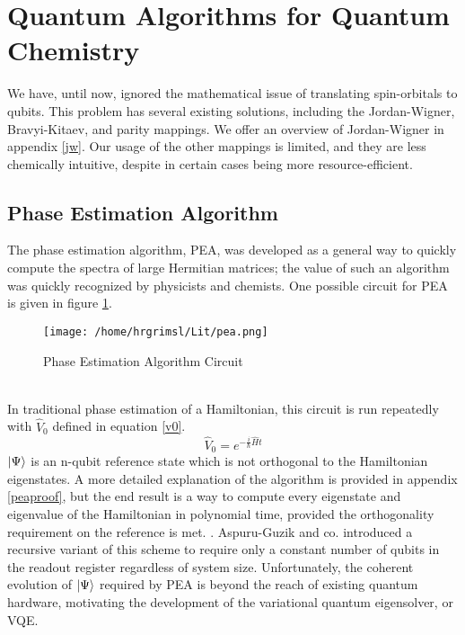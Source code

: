 \documentclass{article}
\begin{document}
\section{Quantum Algorithms for Quantum Chemistry}
\begin{paragraph}{}
We have, until now, ignored the mathematical issue of translating spin-orbitals to qubits.  This problem has several existing solutions, including the Jordan-Wigner, Bravyi-Kitaev, and parity mappings.  We offer an overview of Jordan-Wigner in appendix \ref{jw}.  Our usage of the other mappings is limited, and they are less chemically intuitive, despite in certain cases being more resource-efficient.
\end{paragraph}
\subsection{Phase Estimation Algorithm}
\begin{paragraph}{}
The phase estimation algorithm, PEA, was developed as a general way to quickly compute the spectra of large Hermitian matrices; the value of such an algorithm was quickly recognized by physicists and chemists. \cite{lloyd, alan} One possible circuit for PEA is given in figure \ref{pea}. \cite{alan, lloyd}
\begin{figure}[h!]\caption{Phase Estimation Algorithm Circuit}\label{pea}
\begin{center}
\texttt{[image: /home/hrgrimsl/Lit/pea.png]}
\end{center}
\end{figure}\\
In traditional phase estimation of a Hamiltonian, this circuit is run repeatedly with $\hat{V}_0$ defined in equation \ref{v0}. \cite{lloyd}
\begin{equation}\label{v0}
\hat{V}_0 = e^{-\frac{i}{\hbar}\hat{H}t}
\end{equation}
$\ket{\Psi}$ is an n-qubit reference state which is not orthogonal to the Hamiltonian eigenstates. \cite{lloyd}  A more detailed explanation of the algorithm is provided in appendix \ref{peaproof}, but the end result is a way to compute every eigenstate and eigenvalue of the Hamiltonian in polynomial time, provided the orthogonality requirement on the reference is met. \cite{lloyd}. Aspuru-Guzik and co. introduced a recursive variant of this scheme to require only a constant number of qubits in the readout register regardless of system size. \cite{alan} Unfortunately, the coherent evolution of $\ket{\Psi}$ required by PEA is beyond the reach of existing quantum hardware, motivating the development of the variational quantum eigensolver, or VQE. \cite{peruzzo} 
\end{paragraph}
\end{document}
